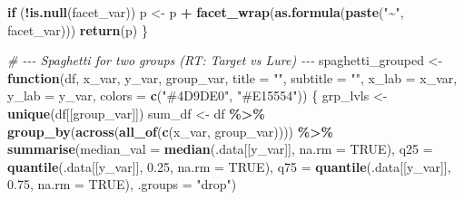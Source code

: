 \documentclass[
]{article}
\newenvironment{Shaded}{\begin{snugshade}}{\end{snugshade}}
\newcommand{\AttributeTok}[1]{\textcolor[rgb]{0.13,0.29,0.53}{#1}}
\newcommand{\CommentTok}[1]{\textcolor[rgb]{0.56,0.35,0.01}{\textit{#1}}}
\newcommand{\ConstantTok}[1]{\textcolor[rgb]{0.56,0.35,0.01}{#1}}
\newcommand{\ControlFlowTok}[1]{\textcolor[rgb]{0.13,0.29,0.53}{\textbf{#1}}}
\newcommand{\FloatTok}[1]{\textcolor[rgb]{0.00,0.00,0.81}{#1}}
\newcommand{\FunctionTok}[1]{\textcolor[rgb]{0.13,0.29,0.53}{\textbf{#1}}}
\newcommand{\NormalTok}[1]{#1}
\newcommand{\OtherTok}[1]{\textcolor[rgb]{0.56,0.35,0.01}{#1}}
\newcommand{\SpecialCharTok}[1]{\textcolor[rgb]{0.81,0.36,0.00}{\textbf{#1}}}
\newcommand{\StringTok}[1]{\textcolor[rgb]{0.31,0.60,0.02}{#1}}
\begin{document}
\begin{Shaded}
\begin{Highlighting}[]
  \ControlFlowTok{if}\NormalTok{ (}\SpecialCharTok{!}\FunctionTok{is.null}\NormalTok{(facet\_var))}
\NormalTok{    p }\OtherTok{\textless{}{-}}\NormalTok{ p }\SpecialCharTok{+} \FunctionTok{facet\_wrap}\NormalTok{(}\FunctionTok{as.formula}\NormalTok{(}\FunctionTok{paste}\NormalTok{(}\StringTok{"\textasciitilde{}"}\NormalTok{, facet\_var)))}
  \FunctionTok{return}\NormalTok{(p)}
\NormalTok{\}}

\CommentTok{\# {-}{-}{-} Spaghetti for two groups (RT: Target vs Lure) {-}{-}{-}}
\NormalTok{spaghetti\_grouped }\OtherTok{\textless{}{-}} \ControlFlowTok{function}\NormalTok{(df, x\_var, y\_var, group\_var,}
                               \AttributeTok{title =} \StringTok{""}\NormalTok{, }\AttributeTok{subtitle =} \StringTok{""}\NormalTok{,}
                               \AttributeTok{x\_lab =}\NormalTok{ x\_var, }\AttributeTok{y\_lab =}\NormalTok{ y\_var,}
                               \AttributeTok{colors =} \FunctionTok{c}\NormalTok{(}\StringTok{"\#4D9DE0"}\NormalTok{, }\StringTok{"\#E15554"}\NormalTok{)) \{}
\NormalTok{  grp\_lvls }\OtherTok{\textless{}{-}} \FunctionTok{unique}\NormalTok{(df[[group\_var]])}
\NormalTok{  sum\_df }\OtherTok{\textless{}{-}}\NormalTok{ df }\SpecialCharTok{\%\textgreater{}\%}
    \FunctionTok{group\_by}\NormalTok{(}\FunctionTok{across}\NormalTok{(}\FunctionTok{all\_of}\NormalTok{(}\FunctionTok{c}\NormalTok{(x\_var, group\_var)))) }\SpecialCharTok{\%\textgreater{}\%}
    \FunctionTok{summarise}\NormalTok{(}\AttributeTok{median\_val =} \FunctionTok{median}\NormalTok{(.data[[y\_var]], }\AttributeTok{na.rm =} \ConstantTok{TRUE}\NormalTok{),}
              \AttributeTok{q25        =} \FunctionTok{quantile}\NormalTok{(.data[[y\_var]], }\FloatTok{0.25}\NormalTok{, }\AttributeTok{na.rm =} \ConstantTok{TRUE}\NormalTok{),}
              \AttributeTok{q75        =} \FunctionTok{quantile}\NormalTok{(.data[[y\_var]], }\FloatTok{0.75}\NormalTok{, }\AttributeTok{na.rm =} \ConstantTok{TRUE}\NormalTok{),}
              \AttributeTok{.groups    =} \StringTok{"drop"}\NormalTok{)}


\end{Highlighting}
\end{Shaded}
\end{document}
